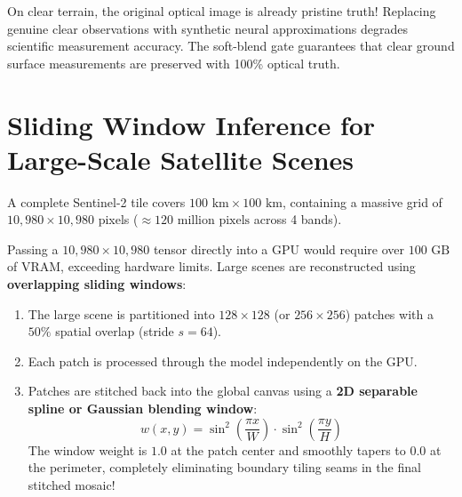 On clear terrain, the original optical image is already pristine truth! Replacing genuine clear observations with synthetic neural approximations degrades scientific measurement accuracy. The soft-blend gate guarantees that clear ground surface measurements are preserved with 100\% optical truth.

\section{Sliding Window Inference for Large-Scale Satellite Scenes}
A complete Sentinel-2 tile covers $100\text{ km} \times 100\text{ km}$, containing a massive grid of $10{,}980 \times 10{,}980$ pixels ($\approx 120\text{ million pixels}$ across 4 bands).

Passing a $10{,}980 \times 10{,}980$ tensor directly into a GPU would require over $100\text{ GB}$ of VRAM, exceeding hardware limits. Large scenes are reconstructed using \textbf{overlapping sliding windows}:
\begin{enumerate}
    \item The large scene is partitioned into $128 \times 128$ (or $256 \times 256$) patches with a $50\%$ spatial overlap (stride $s = 64$).
    \item Each patch is processed through the model independently on the GPU.
    \item Patches are stitched back into the global canvas using a \textbf{2D separable spline or Gaussian blending window}:
    \begin{equation}
    w(x, y) = \sin^2\left(\frac{\pi x}{W}\right) \cdot \sin^2\left(\frac{\pi y}{H}\right)
    \end{equation}
    The window weight is $1.0$ at the patch center and smoothly tapers to $0.0$ at the perimeter, completely eliminating boundary tiling seams in the final stitched mosaic!
\end{enumerate}

